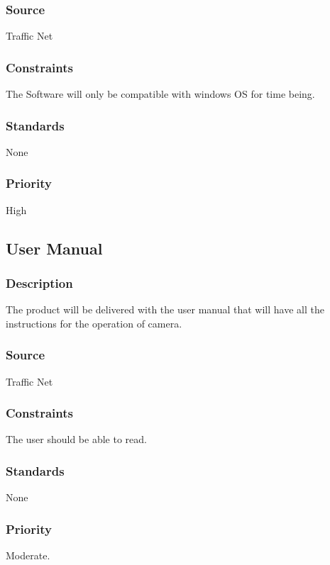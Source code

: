 \subsubsection{Source}
Traffic Net
\subsubsection{Constraints}
The Software will only be compatible with windows OS for time being.
\subsubsection{Standards}
None
\subsubsection{Priority}
High

\subsection{User Manual}
\subsubsection{Description}
The product will be delivered with the user manual that will have all the instructions for the operation of camera.

\subsubsection{Source}
Traffic Net
\subsubsection{Constraints}
The user should be able to read.
\subsubsection{Standards}
None
\subsubsection{Priority}
Moderate.
